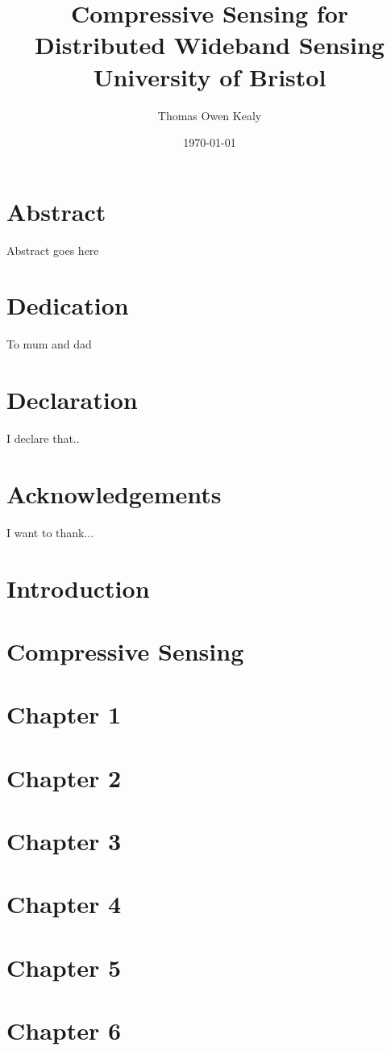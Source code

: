 \documentclass[12pt]{book}
\title{
	{Compressive Sensing for Distributed Wideband Sensing}\\
	{\large University of Bristol}\\
	{}
}
\author{Thomas Owen Kealy}
\date{\today}
\begin{document}
\maketitle

\chapter*{Abstract}
Abstract goes here

\chapter*{Dedication}
To mum and dad

\chapter*{Declaration}
I declare that..

\chapter*{Acknowledgements}
I want to thank...

\tableofcontents

\chapter{Introduction}


\chapter{Compressive Sensing}


\chapter{Chapter 1}


\chapter{Chapter 2}


\chapter{Chapter 3}


\chapter{Chapter 4 }


\chapter{Chapter 5}


\chapter{Chapter 6}



\end{document}
